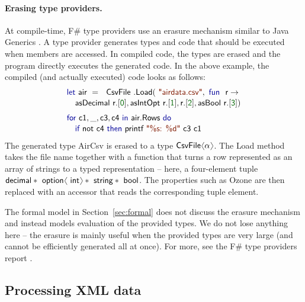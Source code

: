 \documentclass[preprint]{sigplanconf}
\newcommand{\langl}{\begin{picture}(4.5,7)
\put(1.1,2.5){\rotatebox{60}{\line(1,0){5.5}}}
\put(1.1,2.5){\rotatebox{300}{\line(1,0){5.5}}}
\end{picture}}
\newcommand{\rangl}{\begin{picture}(4.5,7)
\put(.9,2.5){\rotatebox{120}{\line(1,0){5.5}}}
\put(.9,2.5){\rotatebox{240}{\line(1,0){5.5}}}
\end{picture}}
\newcommand{\kvd}[1]{\textnormal{\textcolor{kvdclr}{\sffamily #1}}}
\newcommand{\num}[1]{\textnormal{\textcolor{numclr}{\sffamily #1}}}
\newcommand{\str}[1]{\textnormal{\textcolor{strclr}{\sffamily "#1"}}}
\newcommand{\ident}[1]{\textnormal{\sffamily #1}}
\begin{document}
\paragraph{Erasing type providers.}
At compile-time, F\# type providers use an erasure mechanism similar to Java Generics \cite{java-erasure}. 
A type provider generates types and code that should be executed when members are accessed. In compiled
code, the types are erased and the program directly executes the generated code.
In the above example, the compiled (and actually executed) code looks as follows:
%
\begin{equation*}
\begin{array}{l}
 \kvd{let}~\ident{air}~=~\ident{CsvFile}\ident{.Load}(\str{airdata.csv}, \kvd{fun}~\ident{r}\rightarrow\\[0.1em]
 \quad \ident{asDecimal r}.[\num{0}], \ident{asIntOpt r}.[\num{1}], \ident{r}.[\num{2}], \ident{asBool r}.[\num{3}])\\[0.6em]
 \kvd{for}~\ident{c1},\_,\ident{c3},\ident{c4} ~\kvd{in}~\ident{air.Rows}~\kvd{do}\\[0.1em]
 \quad\kvd{if}~\ident{not}~\ident{c4}~\kvd{then}~\ident{printf}~\str{\%s: \%d}~\ident{c3 c1}\\
\end{array}
\end{equation*}
%
The generated type \ident{AirCsv} is erased to a type $\ident{CsvFile}\langl\alpha\rangl$.
The \ident{Load} method takes the file name together with a function that turns a row represented 
as an array of strings to a typed representation -- here, a four-element tuple 
$\ident{decimal}*\ident{option}\langl\ident{int}\rangl*\ident{string}*\ident{bool}$. The properties
such as \ident{Ozone} are then replaced with an accessor that reads the corresponding tuple
element.

The formal model in Section~\ref{sec:formal} does not discuss the erasure mechanism and instead 
models evaluation of the provided types. We do not lose anything here -- the erasure is mainly
useful when the provided types are very large (and cannot be efficiently generated all at once).
For more, see the F\# type providers report \cite{fsharp-typeprov}.



\subsection{Processing XML data}
\label{sec:providers-xml}
\end{document}
